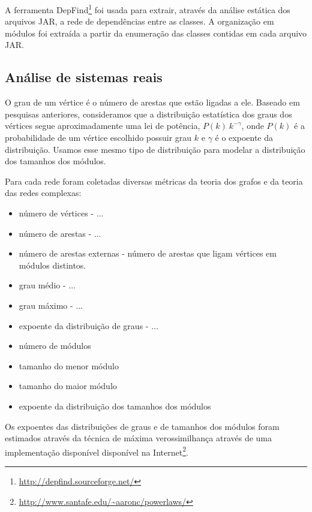 \documentclass{acm_proc_article-sp}
\begin{document}
A ferramenta DepFind\footnote{\url{http://depfind.sourceforge.net/}} foi usada para extrair, através da análise estática dos arquivos JAR, a rede de dependências entre as classes. A organização em módulos foi extraída a partir da enumeração das classes contidas em cada arquivo JAR.

\subsection{Análise de sistemas reais}

O grau de um vértice é o número de arestas que estão ligadas a ele. Baseado em pesquisas anteriores, consideramos que a distribuição estatística dos graus dos vértices segue aproximadamente uma lei de potência, $P(k) ~ k^{-\gamma}$, onde $P(k)$ é a probabilidade de um vértice escolhido possuir grau $k$ e $\gamma$ é o expoente da distribuição. Usamos esse mesmo tipo de distribuição para modelar a distribuição dos tamanhos dos módulos.


Para cada rede foram coletadas diversas métricas da teoria dos grafos e da teoria das redes complexas:

\begin{itemize}
\item número de vértices - ...
\item número de arestas - ...
\item número de arestas externas - número de arestas que ligam vértices em módulos distintos.

\item grau médio - ...
\item grau máximo - ...
\item expoente da distribuição de graus - ...

\item número de módulos
\item tamanho do menor módulo
\item tamanho do maior módulo
\item expoente da distribuição dos tamanhos dos módulos

\end{itemize}

Os expoentes das distribuições de graus e de tamanhos dos módulos foram estimados através da técnica de máxima verossimilhança \cite{Clauset2007} através de uma implementação disponível disponível na Internet\footnote{\url{http://www.santafe.edu/~aaronc/powerlaws/}}. 
\end{document}
